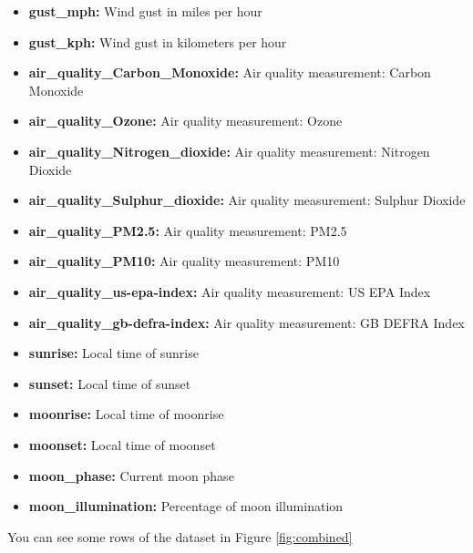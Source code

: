 \documentclass[12pt]{article}
\begin{document}
\begin{multicols}{2}
\begin{itemize}
  \item \textbf{gust\_mph:} Wind gust in miles per hour
  \item \textbf{gust\_kph:} Wind gust in kilometers per hour
  \item \textbf{air\_quality\_Carbon\_Monoxide:} Air quality measurement: Carbon Monoxide
  \item \textbf{air\_quality\_Ozone:} Air quality measurement: Ozone
  \item \textbf{air\_quality\_Nitrogen\_dioxide:} Air quality measurement: Nitrogen Dioxide
  \item \textbf{air\_quality\_Sulphur\_dioxide:} Air quality measurement: Sulphur Dioxide
  \item \textbf{air\_quality\_PM2.5:} Air quality measurement: PM2.5
  \item \textbf{air\_quality\_PM10:} Air quality measurement: PM10
  \item \textbf{air\_quality\_us-epa-index:} Air quality measurement: US EPA Index
  \item \textbf{air\_quality\_gb-defra-index:} Air quality measurement: GB DEFRA Index
  \item \textbf{sunrise:} Local time of sunrise
  \item \textbf{sunset:} Local time of sunset
  \item \textbf{moonrise:} Local time of moonrise
  \item \textbf{moonset:} Local time of moonset
  \item \textbf{moon\_phase:} Current moon phase
  \item \textbf{moon\_illumination:} Percentage of moon illumination
\end{itemize}
\end{multicols}
You can see some rows of the dataset in Figure \ref{fig:combined}
\end{document}
